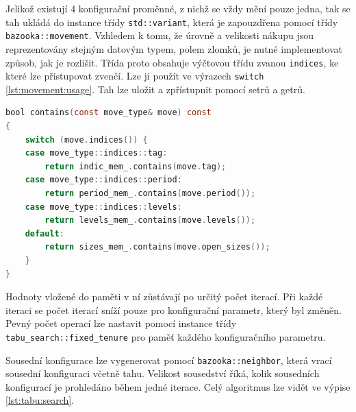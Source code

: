 Jelikož existují 4 konfigurační proměnné, z nichž se vždy mění pouze jedna, tak se tah ukládá do instance třídy \texttt{std::variant}, která je zapouzdřena pomocí třídy \texttt{bazooka::movement}.
Vzhledem k tomu, že úrovně a velikosti nákupu jsou reprezentovány stejným datovým typem, polem zlomků, je nutné implementovat způsob, jak je rozlišit.
Třída proto obsahuje výčtovou třídu zvanou \texttt{indices}, ke které lze přistupovat zvenčí.
Lze ji použít ve výrazech \texttt{switch} \ref{lst:movement:usage}.
Tah lze uložit a zpřístupnit pomocí setrů a getrů.

\begin{lstlisting}[caption={~Použití třídy \texttt{bazooka::movement}},label={lst:movement:usage},captionpos=t,abovecaptionskip=-\medskipamount,belowcaptionskip=\medskipamount,language=C]
bool contains(const move_type& move) const
{
    switch (move.indices()) {
    case move_type::indices::tag:
        return indic_mem_.contains(move.tag);
    case move_type::indices::period:
        return period_mem_.contains(move.period());
    case move_type::indices::levels:
        return levels_mem_.contains(move.levels());
    default:
        return sizes_mem_.contains(move.open_sizes());
    }
}
\end{lstlisting}

Hodnoty vložené do paměti v ní zůstávají po určitý počet iterací.
Při každé iteraci se počet iterací sníží pouze pro konfigurační parametr, který byl změněn.
Pevný počet operací lze nastavit pomocí instance třídy \texttt{tabu\_search::fixed\_tenure} pro paměť každého konfiguračního parametru.

Sousední konfigurace lze vygenerovat pomocí \texttt{bazooka::neighbor}, která vrací sousední konfiguraci včetně tahu.
Velikost sousedství říká, kolik sousedních konfigurací je prohledáno během jedné iterace.
Celý algoritmus lze vidět ve výpise \ref{lst:tabu:search}.


